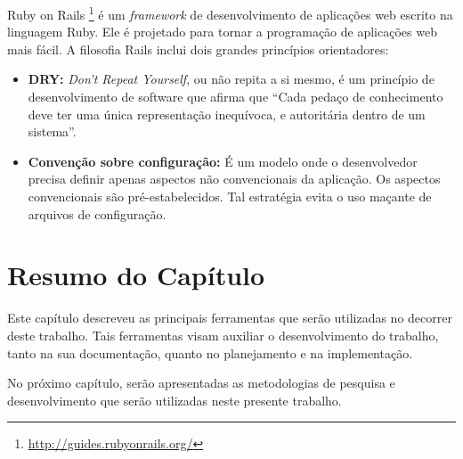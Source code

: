 Ruby on Rails \footnote{\url{http://guides.rubyonrails.org/}} é um \textit{framework} de desenvolvimento de aplicações web escrito na linguagem Ruby. Ele é projetado para tornar a programação de aplicações web mais fácil. A filosofia Rails inclui dois grandes princípios orientadores:

\begin{itemize}
	\item \textbf{DRY:} \textit{Don't Repeat Yourself}, ou não repita a si mesmo, é um princípio de desenvolvimento de software que afirma que ``Cada pedaço de conhecimento deve ter uma única representação inequívoca, e autoritária dentro de um sistema''.

	\item \textbf{Convenção sobre configuração:} É um modelo onde o desenvolvedor precisa definir apenas aspectos não convencionais da aplicação. Os aspectos convencionais são pré-estabelecidos. Tal estratégia evita o uso maçante de arquivos de configuração.
\end{itemize}

\section{Resumo do Capítulo}

Este capítulo descreveu as principais ferramentas que serão utilizadas no decorrer deste trabalho. Tais ferramentas visam auxiliar o desenvolvimento do trabalho, tanto na sua documentação, quanto no planejamento e na implementação.

No próximo capítulo, serão apresentadas as metodologias de pesquisa e desenvolvimento que serão utilizadas neste presente trabalho.
